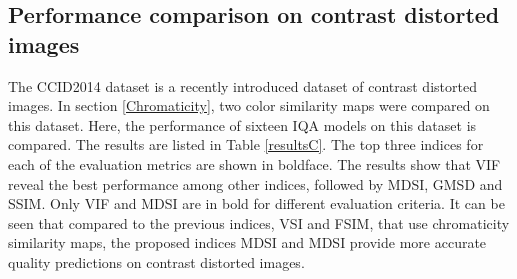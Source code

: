 \subsection{Performance comparison on contrast distorted images}
\label{Contrast} 

The CCID2014 dataset \cite{CCID2014} is a recently introduced dataset of contrast distorted images. In section \ref{Chromaticity}, two color similarity maps were compared on this dataset. Here, the performance of sixteen IQA models on this dataset is compared. The results are listed in Table \ref{resultsC}. The top three indices for each of the evaluation metrics are shown in boldface. The results show that VIF reveal the best performance among other indices, followed by MDSI, GMSD and SSIM. Only VIF and MDSI are in bold for different evaluation criteria. It can be seen that compared to the previous indices, VSI and FSIM, that use chromaticity similarity maps, the proposed indices MDSI and MDSI provide more accurate quality predictions on contrast distorted images.           



